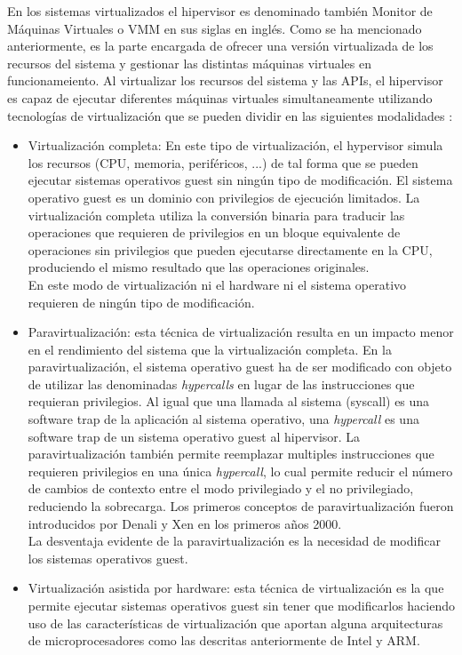 En los sistemas virtualizados el hipervisor es denominado también Monitor de Máquinas Virtuales o \acrshort{VMM} en sus siglas en inglés. Como se ha mencionado anteriormente, es la parte encargada de ofrecer una versión virtualizada de los recursos del sistema y gestionar las distintas máquinas virtuales en funcionameiento. Al virtualizar los recursos del sistema y las APIs, el hipervisor es capaz de ejecutar diferentes máquinas virtuales simultaneamente utilizando tecnologías de virtualización que se pueden dividir en las siguientes modalidades \cite{hyper_perf_arm}:
\begin{itemize}
	\item Virtualización completa: En este tipo de virtualización, el hypervisor simula los recursos (CPU, memoria, periféricos, ...) de tal forma que se pueden ejecutar sistemas operativos guest sin ningún tipo de modificación. El sistema operativo guest es un dominio con privilegios de ejecución limitados. La virtualización completa utiliza la conversión binaria para traducir las operaciones que requieren de privilegios en un bloque equivalente de operaciones sin privilegios que pueden ejecutarse directamente en la CPU, produciendo el mismo resultado que las operaciones originales.\\
	En este modo de virtualización ni el hardware ni el sistema operativo requieren de ningún tipo de modificación.
	\item Paravirtualización: esta técnica de virtualización resulta en un impacto menor en el rendimiento del sistema que la virtualización completa. En la paravirtualización, el sistema operativo guest ha de ser modificado con objeto de utilizar las denominadas \textit{hypercalls} en lugar de las instrucciones que requieran privilegios. Al igual que una llamada al sistema (syscall) es una software trap de la aplicación al sistema operativo, una \textit{hypercall} es una software trap de un sistema operativo guest al hipervisor. La paravirtualización también permite reemplazar multiples instrucciones que requieren privilegios en una única \textit{hypercall}, lo cual permite reducir el número de cambios de contexto entre el modo privilegiado y el no privilegiado, reduciendo la sobrecarga. Los primeros conceptos de paravirtualización fueron introducidos por Denali \cite{denali} y Xen en los primeros años 2000.\\
	La desventaja evidente de la paravirtualización es la necesidad de modificar los sistemas operativos guest.
	\item Virtualización asistida por hardware: esta técnica de virtualización es la que permite ejecutar sistemas operativos guest sin tener que modificarlos haciendo uso de las características de virtualización que aportan alguna arquitecturas de microprocesadores como las descritas anteriormente de Intel y ARM.
\end{itemize}

